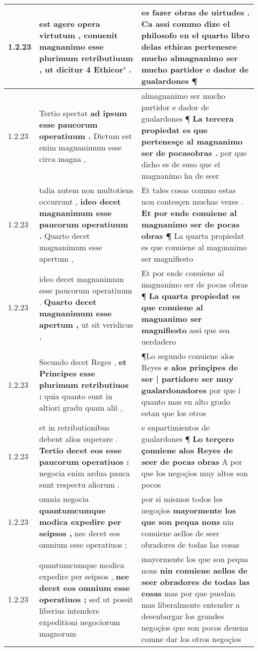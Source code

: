 \begin{tabular}{|p{1cm}|p{6.5cm}|p{6.5cm}|}
1.2.23 & est agere opera virtutum , \textbf{ conuenit magnanimo esse plurimum retributiuum , } ut dicitur 4 Ethicor’ . & es fazer obras de uirtudes . \textbf{ Ca assi commo dize el philosofo en el quarto libro delas ethicas pertenesce mucho } almagnanimo ser mucho partidor e dador de gualardones ¶ \\\hline
1.2.23 & Tertio spectat \textbf{ ad ipsum esse paucorum operatiuum . } Dictum est enim magnanimum esse circa magna , & almagnanimo ser mucho partidor e dador de gualardones ¶ \textbf{ La tercera propiedat es que pertenesçe al magnanimo ser de pocasobras . } por que dicho es de suso que el magnanimo ha de seer \\\hline
1.2.23 & talia autem non multotiens occurrunt , \textbf{ ideo decet magnanimum esse paucorum operatiuum . } Quarto decet magnanimum esse apertum , & Et tales cosas commo estas non contesçen muchas vezes . \textbf{ Et por ende conuiene al magnanimo ser de pocas obras ¶ } La quarta propiedat es que conuiene al maguanimo ser magnifiesto \\\hline
1.2.23 & ideo decet magnanimum esse paucorum operatiuum . \textbf{ Quarto decet magnanimum esse apertum , } ut sit veridicus , & Et por ende conuiene al magnanimo ser de pocas obras ¶ \textbf{ La quarta propiedat es que conuiene al maguanimo ser magnifiesto } assi que sea uerdadero \\\hline
1.2.23 & Secundo decet Reges , \textbf{ et Principes esse plurimum retributiuos : } quia quanto sunt in altiori gradu quam alii , & ¶Lo segundo conuiene alos Reyes \textbf{ e alos prinçipes de ser | partidore ser muy gualardonadores } por que i quanto mas en alto grado estan que los otros \\\hline
1.2.23 & et in retributionibus debent alios superare . \textbf{ Tertio decet eos esse paucorum operatiuos : } negocia enim ardua pauca sunt respectu aliorum . & e enpartimientos de gualardones ¶ \textbf{ Lo terçero çonuiene alos Reyes de seer de pocas obras } A por que los negoçios muy altos son pocos \\\hline
1.2.23 & omnia negocia \textbf{ quantumcumque modica expedire per seipsos , } nec decet eos omnium esse operatiuos ; & por si mismos todos los negoçios \textbf{ mayormente los que son pequa nons } nin conuiene aellos de seer obradores de todas las cosas \\\hline
1.2.23 & quantumcumque modica expedire per seipsos , \textbf{ nec decet eos omnium esse operatiuos ; } sed ut possit liberius intendere expeditioni negociorum magnorum & mayormente los que son pequa nons \textbf{ nin conuiene aellos de seer obradores de todas las cosas } mas por que puedan mas liberalmente entender a desenbargar los grandes negoçios que son pocos deuena comne dar los otros negoçios \\\hline

\end{tabular}
